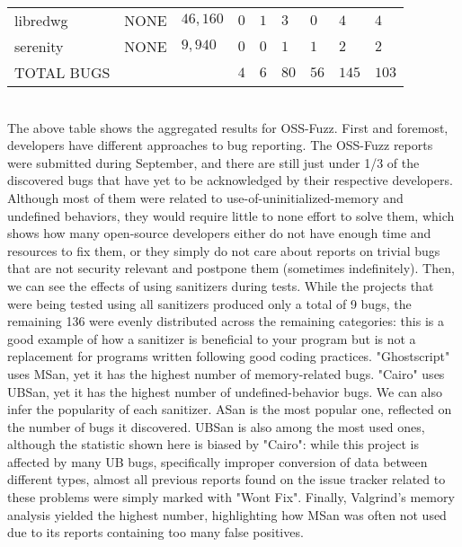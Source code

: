 \begin{adjustbox}{width=\textwidth,center}
\begin{tabular}{|l|l|l|l|l|l|l|l|l|}
libredwg         & NONE                & $46,160$            & $0$              & $1$           & $3$           & $0$            & $4$             & $4$                 \\
serenity         & NONE                & $9,940$             & $0$              & $0$           & $1$           & $1$            & $2$             & $2$                 \\
\hline
TOTAL BUGS   &   &   &$4$   &$6$   &$80$   &$56$   &$145$   &$103$       \\
\hline
\end{tabular}
\end{adjustbox}{}
\ \\ \newline
The above table shows the aggregated results for OSS-Fuzz.
\newline \newline
First and foremost, developers have different approaches to bug reporting. 
\newline
The OSS-Fuzz reports were submitted during September, and there are still just under 1/3 of the discovered bugs that have yet to be acknowledged by their respective developers. Although most of them were related to use-of-uninitialized-memory and undefined behaviors, they would require little to none effort to solve them, which shows how many open-source developers either do not have enough time and resources to fix them, or they simply do not care about reports on trivial bugs that are not security relevant and postpone them (sometimes indefinitely).
\newline \newline
Then, we can see the effects of using sanitizers during tests.
\newline
While the projects that were being tested using all sanitizers produced only a total of 9 bugs, the remaining 136 were evenly distributed across the remaining categories: this is a good example of how a sanitizer is beneficial to your program but is not a replacement for programs written following good coding practices.
\newline
"Ghostscript" uses MSan, yet it has the highest number of memory-related bugs.
\newline
"Cairo" uses UBSan, yet it has the highest number of undefined-behavior bugs.
\newline \newline
We can also infer the popularity of each sanitizer.
\newline
ASan is the most popular one, reflected on the number of bugs it discovered.
\newline
UBSan is also among the most used ones, although the statistic shown here is biased by "Cairo": while this project is affected by many UB bugs, specifically improper conversion of data between different types, almost all previous reports found on the issue tracker related to these problems were simply marked with "Wont Fix".
\newline
Finally, Valgrind's memory analysis yielded the highest number, highlighting how MSan was often not used due to its reports containing too many false positives.


